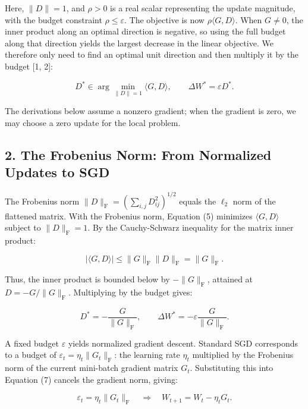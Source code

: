 \documentclass[
  english,
  10pt,
  a4paper,
]{article}
\begin{document}
Here, \(\|D\|=1\), and \(\rho>0\) is a real scalar representing the
update magnitude, with the budget constraint \(\rho\leq\varepsilon\).
The objective is now \(\rho\langle G,D\rangle\). When \(G\ne0\), the
inner product along an optimal direction is negative, so using the full
budget along that direction yields the largest decrease in the linear
objective. We therefore only need to find an optimal unit direction and
then multiply it by the budget {[}1, 2{]}:

\nopagebreak[4]

\[
D^*\in\arg\min_{\|D\|=1}\langle G,D\rangle,
\qquad
\boxed{\Delta W^*=\varepsilon D^*.}
\tag{5}
\]

The derivations below assume a nonzero gradient; when the gradient is
zero, we may choose a zero update for the local problem.

\subsection{2. The Frobenius Norm: From Normalized Updates to
SGD}\label{the-frobenius-norm-from-normalized-updates-to-sgd}

The Frobenius norm \(\|D\|_{\mathrm F}=(\sum_{i,j}D_{ij}^2)^{1/2}\)
equals the \(\ell_2\) norm of the flattened matrix. With the Frobenius
norm, Equation (5) minimizes \(\langle G,D\rangle\) subject to
\(\|D\|_{\mathrm F}=1\). By the Cauchy-Schwarz inequality for the matrix
inner product:

\nopagebreak[4]

\[
|\langle G,D\rangle|
\leq\|G\|_{\mathrm F}\|D\|_{\mathrm F}
=\|G\|_{\mathrm F}.
\tag{6}
\]

Thus, the inner product is bounded below by \(-\|G\|_{\mathrm F}\),
attained at \(D=-G/\|G\|_{\mathrm F}\). Multiplying by the budget gives:

\nopagebreak[4]

\[
D^*=-\frac{G}{\|G\|_{\mathrm F}},
\qquad
\boxed{\Delta W^*=-\varepsilon\frac{G}{\|G\|_{\mathrm F}}.}
\tag{7}
\]

A fixed budget \(\varepsilon\) yields normalized gradient descent.
Standard SGD corresponds to a budget of
\(\varepsilon_t=\eta_t\|G_t\|_{\mathrm F}\): the learning rate
\(\eta_t\) multiplied by the Frobenius norm of the current mini-batch
gradient matrix \(G_t\). Substituting this into Equation (7) cancels the
gradient norm, giving:

\nopagebreak[4]

\[
\varepsilon_t=\eta_t\|G_t\|_{\mathrm F}
\quad\Longrightarrow\quad
\boxed{W_{t+1}=W_t-\eta_t G_t.}
\tag{8}
\]
\end{document}
